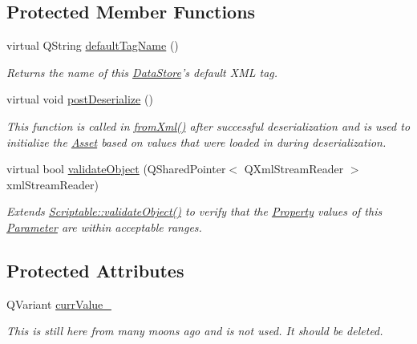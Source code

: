\subsection*{Protected Member Functions}
\begin{DoxyCompactItemize}
\item 
virtual Q\-String \hyperlink{class_picto_1_1_parameter_a78d708af5b8c02e1d7529250e1e2ee85}{default\-Tag\-Name} ()
\begin{DoxyCompactList}\small\item\em Returns the name of this \hyperlink{class_picto_1_1_data_store}{Data\-Store}'s default X\-M\-L tag. \end{DoxyCompactList}\item 
virtual void \hyperlink{class_picto_1_1_parameter_aacf1829d9c0e0dc44a7854412f3face6}{post\-Deserialize} ()
\begin{DoxyCompactList}\small\item\em This function is called in \hyperlink{class_picto_1_1_asset_a8bed4da09ecb1c07ce0dab313a9aba67}{from\-Xml()} after successful deserialization and is used to initialize the \hyperlink{class_picto_1_1_asset}{Asset} based on values that were loaded in during deserialization. \end{DoxyCompactList}\item 
virtual bool \hyperlink{class_picto_1_1_parameter_a94c0e4191ffcc0bd642b647d24557082}{validate\-Object} (Q\-Shared\-Pointer$<$ Q\-Xml\-Stream\-Reader $>$ xml\-Stream\-Reader)
\begin{DoxyCompactList}\small\item\em Extends \hyperlink{class_picto_1_1_scriptable_ab6e2944c43a3b5d418bf7b251594386d}{Scriptable\-::validate\-Object()} to verify that the \hyperlink{class_picto_1_1_property}{Property} values of this \hyperlink{class_picto_1_1_parameter}{Parameter} are within acceptable ranges. \end{DoxyCompactList}\end{DoxyCompactItemize}
\subsection*{Protected Attributes}
\begin{DoxyCompactItemize}
\item 
\hypertarget{class_picto_1_1_parameter_ab60206859e3500c6f3cef8858781acdb}{Q\-Variant \hyperlink{class_picto_1_1_parameter_ab60206859e3500c6f3cef8858781acdb}{curr\-Value\-\_\-}}\label{class_picto_1_1_parameter_ab60206859e3500c6f3cef8858781acdb}

\begin{DoxyCompactList}\small\item\em This is still here from many moons ago and is not used. It should be deleted. \end{DoxyCompactList}\end{DoxyCompactItemize}
